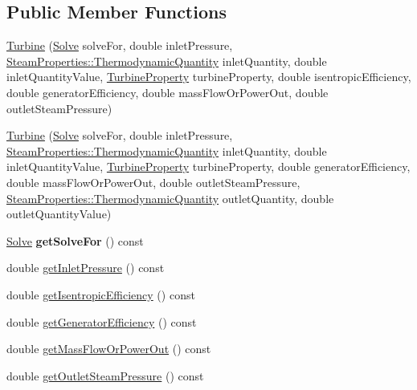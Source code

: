 \subsection*{Public Member Functions}
\begin{DoxyCompactItemize}
\item 
\hyperlink{class_turbine_a3c3c871b9fe57d48dd06b109794381dc}{Turbine} (\hyperlink{class_turbine_a9fd7beba6c6f071e228fbe3e07969d2b}{Solve} solve\+For, double inlet\+Pressure, \hyperlink{class_steam_properties_ae0294bedf7d178c2d8fb6aed0f62fbff}{Steam\+Properties\+::\+Thermodynamic\+Quantity} inlet\+Quantity, double inlet\+Quantity\+Value, \hyperlink{class_turbine_a5db4f65cf2539e3837684d53221ade12}{Turbine\+Property} turbine\+Property, double isentropic\+Efficiency, double generator\+Efficiency, double mass\+Flow\+Or\+Power\+Out, double outlet\+Steam\+Pressure)
\item 
\hyperlink{class_turbine_a1ec182906c075407882de542954d9030}{Turbine} (\hyperlink{class_turbine_a9fd7beba6c6f071e228fbe3e07969d2b}{Solve} solve\+For, double inlet\+Pressure, \hyperlink{class_steam_properties_ae0294bedf7d178c2d8fb6aed0f62fbff}{Steam\+Properties\+::\+Thermodynamic\+Quantity} inlet\+Quantity, double inlet\+Quantity\+Value, \hyperlink{class_turbine_a5db4f65cf2539e3837684d53221ade12}{Turbine\+Property} turbine\+Property, double generator\+Efficiency, double mass\+Flow\+Or\+Power\+Out, double outlet\+Steam\+Pressure, \hyperlink{class_steam_properties_ae0294bedf7d178c2d8fb6aed0f62fbff}{Steam\+Properties\+::\+Thermodynamic\+Quantity} outlet\+Quantity, double outlet\+Quantity\+Value)
\item 
\mbox{\label{class_turbine_a58c73057a4b890eab2af2b42c82484e6}} 
\hyperlink{class_turbine_a9fd7beba6c6f071e228fbe3e07969d2b}{Solve} {\bfseries get\+Solve\+For} () const
\item 
double \hyperlink{class_turbine_a148ad3877851f1c3931d8a6771d750c5}{get\+Inlet\+Pressure} () const
\item 
double \hyperlink{class_turbine_a5d907859de4acc153a32bd443238b445}{get\+Isentropic\+Efficiency} () const
\item 
double \hyperlink{class_turbine_a92266fd994310d1842ba37c05bc40bf8}{get\+Generator\+Efficiency} () const
\item 
double \hyperlink{class_turbine_a820a090d264b96ee84f717555545c287}{get\+Mass\+Flow\+Or\+Power\+Out} () const
\item 
double \hyperlink{class_turbine_a1589b2364a553db7aaa875bb543d171d}{get\+Outlet\+Steam\+Pressure} () const

\end{DoxyCompactItemize}
